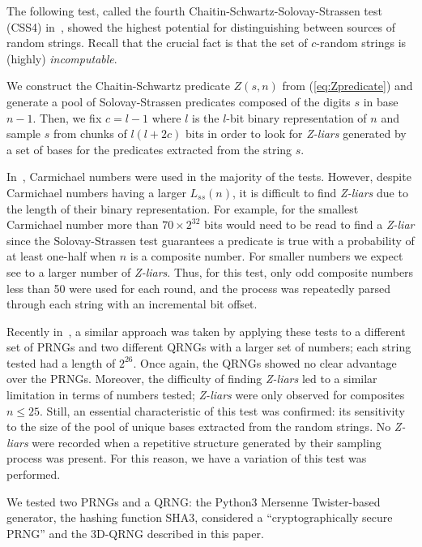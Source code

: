 \documentclass[l1pt]{elsarticle}
\begin{document}
The following test, called the fourth Chaitin-Schwartz-Solovay-Strassen test (CSS4) in~\cite{abbott2018experimentally}, showed the highest potential for distinguishing between sources of random strings. Recall that the crucial fact is that the set of $c$-random
strings is (highly) {\it incomputable}.


We construct the Chaitin-Schwartz predicate $ Z(s,n)$ from (\ref{eq:Zpredicate})
and generate a pool of Solovay-Strassen predicates composed of the digits  $s$ in base $n-1$. Then, we fix $c=l-1$ where $l$ is the $l$-bit binary representation of $n$ and sample $s$ from chunks of $l(l+2c)$ bits in order to look for \emph{Z-liars} generated by a set of bases for the predicates extracted from the string $s$.

In~\cite{abbott2018experimentally}, Carmichael numbers were used in the majority of the tests. However, despite Carmichael numbers having a larger $L_{ss}(n)$, it is difficult to find \emph{Z-liars} due to the length of their binary representation. For example, for the smallest Carmichael number more than $70\times 2^{32}$ bits would need to be read to find a \emph{Z-liar} since the Solovay-Strassen test guarantees a predicate is true with a probability of at least one-half when
$n$ is a composite number. For smaller numbers we expect see to a larger number of \emph{Z-liars}. Thus, for this test, only odd composite numbers less than 50 were used for each round, and the process was repeatedly parsed through each string with an incremental bit offset.

Recently in~\cite{searching_kavulich_2021}, a similar approach was taken by applying these tests to a different set of PRNGs and two different QRNGs with a larger set of numbers; each string tested had a length of $2^{26}$. Once again, the QRNGs showed no clear advantage over the PRNGs. Moreover, the difficulty of finding \emph{Z-liars} led to a similar limitation in terms of numbers tested; \emph{Z-liars} were only observed for composites $n\leq 25$.
Still, an essential characteristic of this test was confirmed: its sensitivity to the size of the pool of unique bases extracted from the random strings. No \emph{Z-liars} were recorded when a repetitive structure generated by their sampling process was present. For this reason, we have a variation of this test was performed.

We tested two PRNGs and a QRNG: the Python3 Mersenne Twister-based generator, the hashing function SHA3, considered a ``cryptographically secure PRNG'' and the 3D-QRNG described in this paper.
\end{document}
